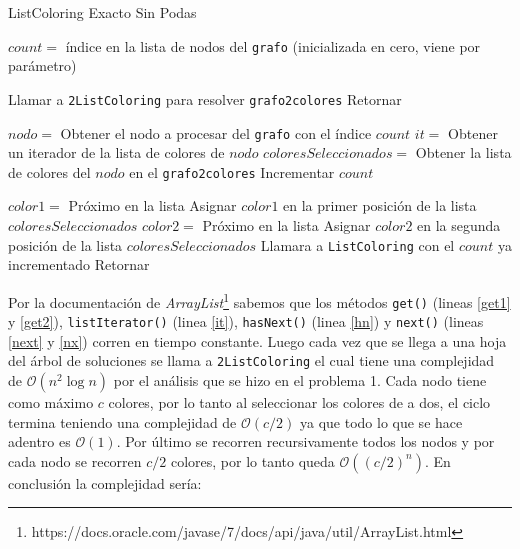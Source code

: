 \begin{algorithm}[H]
\caption{ListColoring Exacto Sin Podas}
\label{lce}
\begin{algorithmic}[1]

\STATE $count = $ índice en la lista de nodos del \texttt{grafo} (inicializada en cero, viene por parámetro)

	\STATE Llamar a \texttt{2ListColoring} para resolver \texttt{grafo2colores}  %
	\STATE Retornar
\ENDIF

\STATE $nodo = $ Obtener el nodo a procesar del \texttt{grafo} con el índice $count$  \label{get1}
\STATE $it = $ Obtener un iterador de la lista de colores de $nodo$  \label{it}
\STATE $coloresSeleccionados = $ Obtener la lista de colores del $nodo$ en el \texttt{grafo2colores}  \label{get2}
\STATE Incrementar $count$ 

 \label{hn}
	\STATE $color1 = $ Próximo en la lista  \label{next}
	\STATE Asignar $color1$ en la primer posición de la lista $coloresSeleccionados$ 
		\STATE $color2 = $ Próximo en la lista  \label{nx}
		\STATE Asignar $color2$ en la segunda posición de la lista $coloresSeleccionados$ 
	\ENDIF
	\STATE Llamara a \texttt{ListColoring} con el $count$ ya incrementado
\ENDWHILE
\STATE Retornar
\end{algorithmic}
\end{algorithm}
\leavevmode
\newline
Por la documentación de \emph{ArrayList}\footnote{https://docs.oracle.com/javase/7/docs/api/java/util/ArrayList.html} sabemos que los métodos \texttt{get()} (lineas \ref{get1} y \ref{get2}), \texttt{listIterator()} (linea \ref{it}), \texttt{hasNext()} (linea \ref{hn}) y \texttt{next()} (lineas \ref{next} y \ref{nx}) corren en tiempo constante. Luego cada vez que se llega a una hoja del árbol de soluciones se llama a \texttt{2ListColoring} el cual tiene una complejidad de $\mathcal{O}(n^2 \log{n})$ por el análisis que se hizo en el problema 1. Cada nodo tiene como máximo $c$ colores, por lo tanto al seleccionar los colores de a dos, el ciclo termina teniendo una complejidad de $\mathcal{O}(c/2)$ ya que todo lo que se hace adentro es $\mathcal{O}(1)$. Por último se recorren recursivamente todos los nodos y por cada nodo se recorren $c/2$ colores, por lo tanto queda $\mathcal{O}((c/2)^n)$. En conclusión la complejidad sería:

